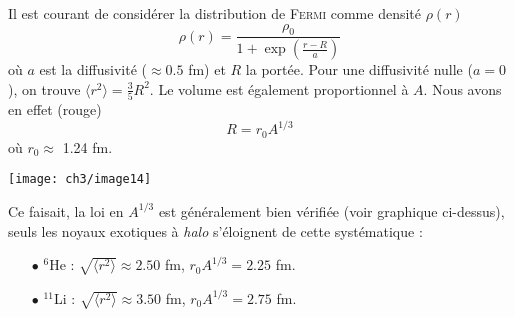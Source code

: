 Il est courant de considérer la distribution de \textsc{Fermi} comme densité $\rho(r)$
\begin{equation}
\rho(r) = \frac{\rho_0}{1+\exp\left(\frac{r-R}{a}\right)}
\end{equation}
où $a$ est la diffusivité ($\approx 0.5$ fm) et $R$ la portée. Pour une diffusivité nulle ($a=0$), on trouve
$\langle r^2\rangle = \frac{3}{5}R^2$. Le volume est également proportionnel à $A$. Nous avons en effet (rouge)
\begin{equation}
R = r_0A^{1/3}
\end{equation}
où $r_0 \approx$ 1.24 fm. 
\begin{center}
	\texttt{[image: ch3/image14]}
\end{center}

Ce faisait, la loi en $A^{1/3}$ est généralement bien vérifiée (voir graphique ci-dessus),
seuls les noyaux exotiques à \textit{halo} s'éloignent de cette systématique :
\begin{itemize}
\item[$\bullet$] $^6$He : $\sqrt{\langle r^2\rangle} \approx 2.50$ fm, $r_0A^{1/3} = 2.25$ fm.
\item[$\bullet$] $^11$Li : $\sqrt{\langle r^2\rangle} \approx 3.50$ fm, $r_0A^{1/3} = 2.75$ fm.
\end{itemize}\ \\

